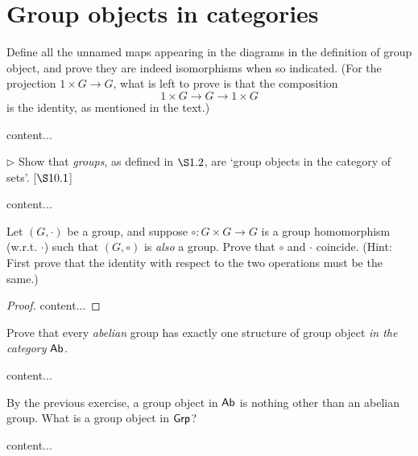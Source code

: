 \section{Group objects in categories}
\extitle

\begin{exercise}
	Define all the unnamed maps appearing in the diagrams in the definition of group object, and prove they are indeed isomorphisms when so indicated. (For the projection $1\times G \to G$, what is left to prove is that the composition
	\[
		1\times G \to G \to 1\times G
	\]
	is the identity, as mentioned in the text.)
\end{exercise}
\begin{solution}
	content...
\end{solution}

\begin{exercise}
	$\triangleright$ Show that \emph{groups}, as defined in $\S 1.2$, are `group objects in the category of sets'. [$\S 10.1$]
\end{exercise}
\begin{solution}
	content...
\end{solution}

\begin{exercise}
	Let $(G,\cdot)$ be a group, and suppose $\circ\colon G\times G \to G$ is a group homomorphism (w.r.t. $\cdot$) such that $(G,\circ)$ is \emph{also} a group. Prove that $\circ$ and $\cdot$ coincide. (Hint: First prove that the identity with respect to the two operations must be the same.)
\end{exercise}
\begin{proof}
	content...
\end{proof}

\begin{exercise}
	Prove that every \emph{abelian} group has exactly one structure of group object \emph{in the category} $\textsf{Ab}$.
\end{exercise}
\begin{solution}
	content...
\end{solution}

\begin{exercise}
	By the previous exercise, a group object in $\textsf{Ab}$ is nothing other than an abelian group. What is a group object in $\textsf{Grp}$?
\end{exercise}
\begin{solution}
	content...
\end{solution}